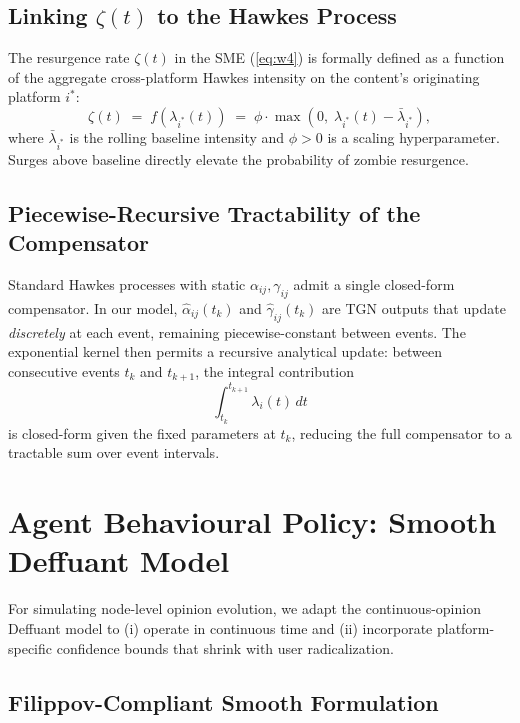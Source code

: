 \documentclass[11pt]{article}
\begin{document}
\subsection{Linking $\zeta(t)$ to the Hawkes Process}

The resurgence rate $\zeta(t)$ in the SME (\cref{eq:w4}) is formally defined as
a function of the aggregate cross-platform Hawkes intensity on the content's
originating platform $i^*$:
\begin{equation}
  \zeta(t) \;=\; f\!\left(\lambda_{i^*}(t)\right)
  \;=\; \phi\cdot\max\!\left(0,\;\lambda_{i^*}(t) - \bar{\lambda}_{i^*}\right),
  \label{eq:zeta}
\end{equation}
where $\bar{\lambda}_{i^*}$ is the rolling baseline intensity and $\phi > 0$
is a scaling hyperparameter. Surges above baseline directly elevate the
probability of zombie resurgence.

\subsection{Piecewise-Recursive Tractability of the Compensator}
\label{sec:tractability}

Standard Hawkes processes with static $\alpha_{ij},\gamma_{ij}$ admit a single
closed-form compensator. In our model, $\hat{\alpha}_{ij}(t_k)$ and
$\hat{\gamma}_{ij}(t_k)$ are TGN outputs that update \emph{discretely} at each
event, remaining piecewise-constant between events. The exponential kernel then
permits a recursive analytical update: between consecutive events $t_k$ and
$t_{k+1}$, the integral contribution
\[
  \int_{t_k}^{t_{k+1}} \lambda_i(t)\,dt
\]
is closed-form given the fixed parameters at $t_k$, reducing the full
compensator to a tractable sum over event intervals.

\section{Agent Behavioural Policy: Smooth Deffuant Model}
\label{sec:deffuant}

For simulating node-level opinion evolution, we adapt the continuous-opinion
Deffuant model to (i) operate in continuous time and (ii) incorporate
platform-specific confidence bounds that shrink with user radicalization.

\subsection{Filippov-Compliant Smooth Formulation}
\end{document}
